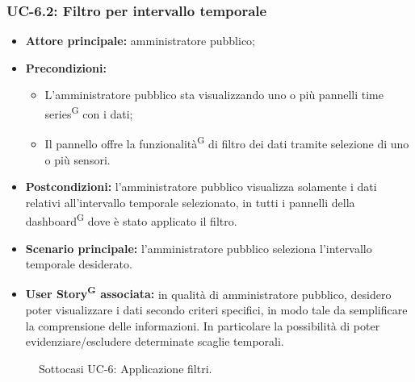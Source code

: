 \documentclass[8pt]{article}
\newcommand{\glossterm}[1]{#1\textsuperscript{G}} %
\begin{document}
\subsubsection*{UC-6.2: Filtro per intervallo temporale}
\begin{itemize}
    \item \textbf{Attore principale:} amministratore pubblico;
    \item \textbf{Precondizioni:}
    \begin{itemize}
        \item L’amministratore pubblico sta visualizzando uno o più pannelli \glossterm{time series} con i dati;
        \item Il pannello offre la \glossterm{funzionalità} di filtro dei dati tramite selezione di uno o più sensori.
    \end{itemize}
    \item \textbf{Postcondizioni:} l’amministratore pubblico visualizza solamente i dati relativi all’intervallo
temporale selezionato, in tutti i pannelli della \glossterm{dashboard} dove è stato applicato il filtro.
    \item \textbf{Scenario principale: }l’amministratore pubblico seleziona l’intervallo temporale desiderato.
    \item \textbf{\glossterm{User Story} associata:} in qualità di amministratore pubblico, desidero poter
        visualizzare i dati secondo criteri specifici, in modo tale da semplificare la comprensione
        delle informazioni. In particolare la possibilità di poter evidenziare/escludere determinate
        scaglie temporali.
\end{itemize}
\begin{figure}[ht!]
    \centering
    \caption{Sottocasi UC-6: Applicazione filtri.}
    \label{fig:Sottocasi UC-6: Applicazione filtri}
\end{figure}
\end{document}
